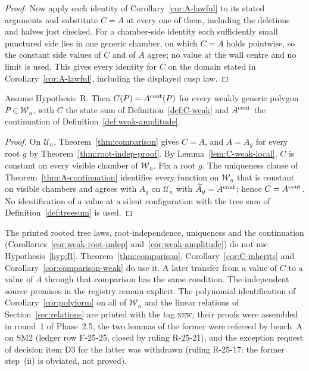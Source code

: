 \begin{proof}
Now apply each identity of Corollary~\ref{cor:A-lawful} to its stated
arguments and substitute $C=A$ at every one of them, including the
deletions and halves just checked. For a chamber-side identity each
sufficiently small punctured side lies in one generic chamber, on which
$C=A$ holds pointwise, so the constant side values of $C$ and of $A$
agree; no value at the wall centre and no limit is used. This gives every
identity for $C$ on the domain stated in Corollary~\ref{cor:A-lawful},
including the displayed cusp law.
\end{proof}

\begin{corollary}\label{cor:comparison-weak}
Assume Hypothesis~R. Then $C(P)=A^{\rm cont}(P)$ for every weakly generic
polygon $P\in\mathcal W_n$, with $C$ the state sum of
Definition~\ref{def:C-weak} and $A^{\rm cont}$ the continuation of
Definition~\ref{def:weak-amplitude}.
\end{corollary}
\begin{proof}
On $\mathcal U_n$, Theorem~\ref{thm:comparison} gives $C=A$, and $A=A_g$
for every root $g$ by Theorem~\ref{thm:root-indep-proof}. By
Lemma~\ref{lem:C-weak-local}, $C$ is constant on every visible chamber of
$\mathcal W_n$. Fix a root $g$. The uniqueness clause of
Theorem~\ref{thm:A-continuation} identifies every function on
$\mathcal W_n$ that is constant on visible chambers and agrees with $A_g$
on $\mathcal U_n$ with $\widetilde A_g=A^{\rm cont}$; hence
$C=A^{\rm cont}$. No identification of a value at a silent configuration
with the tree sum of Definition~\ref{def:treesum} is used.
\end{proof}

\begin{remark}\label{rem:conditional}
The printed rooted tree laws, root-independence, uniqueness and the
continuation (Corollaries~\ref{cor:weak-root-indep}
and~\ref{cor:weak-amplitude}) do not use Hypothesis~\ref{hyp:R}.
Theorem~\ref{thm:comparison}, Corollary~\ref{cor:C-inherits} and
Corollary~\ref{cor:comparison-weak} do use it. A later transfer from a
value of $C$ to a value of $A$ through that comparison has the same
condition. The independent source premises in the registry remain
explicit. The polynomial identification of Corollary~\ref{cor:polyform} on
all of $\mathcal W_n$ and the linear relations of
Section~\ref{sec:relations} are printed with the tag \textsc{new}; their
proofs were assembled in round~1 of Phase~2.5, the two lemmas of the former
were refereed by bench~A on SM2 (ledger row F-25-25, closed by ruling
R-25-21), and the exception request of decision item D3 for the latter was
withdrawn (ruling R-25-17: the former step~(ii) is obviated, not proved).
\end{remark}
